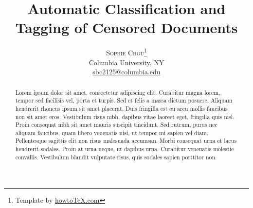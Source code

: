 \documentclass[twoside]{article}
\title{\vspace{-15mm}%
	\fontsize{24pt}{10pt}\selectfont
	\textbf{Automatic Classification and Tagging of Censored Documents}
	}
\author{%
	\large
	\textsc{Sophie Chou}\thanks{Template by \href{http://www.howtotex.com}{howtoTeX.com}} \\[2mm]
	\normalsize	Columbia University, NY \\
	\normalsize	\href{mailto:sbc2125@columbia.edu}{sbc2125@columbia.edu}
	\vspace{-5mm}
	}
\date{}
\begin{document}
\maketitle
\thispagestyle{fancy}

\begin{abstract}
\noindent Lorem ipsum dolor sit amet, consectetur adipiscing elit. Curabitur magna lorem, tempor sed facilisis vel, porta et turpis. Sed et felis a massa dictum posuere. Aliquam hendrerit rhoncus ipsum sit amet placerat. Duis fringilla est eu arcu mollis faucibus non sit amet eros. Vestibulum risus nibh, dapibus vitae laoreet eget, fringilla quis nisl. Proin consequat nibh sit amet mauris suscipit tincidunt. Sed rutrum, purus nec aliquam faucibus, quam libero venenatis nisi, ut tempor mi sapien vel diam. Pellentesque sagittis elit non risus malesuada accumsan. Morbi consequat urna et lacus hendrerit sodales. Proin at urna neque, ut dapibus urna. Curabitur venenatis molestie convallis. Vestibulum blandit vulputate risus, quis sodales sapien porttitor non.
\end{abstract}
	
\end{document}
